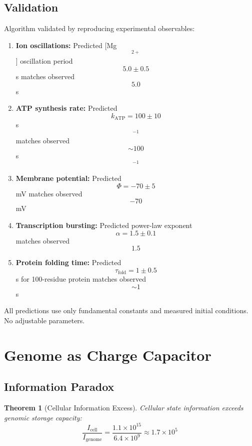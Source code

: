 \documentclass[11pt,twocolumn,a4paper]{article}
\newtheorem{theorem}{Theorem}[section]
\theoremstyle{remark}
\begin{document}
\subsection{Validation}

Algorithm validated by reproducing experimental observables:

\begin{enumerate}
\item \textbf{Ion oscillations:} Predicted [Mg$$^{2+}$$] oscillation period $$5.0 \pm 0.5$$ s matches observed $$5.0$$ s

\item \textbf{ATP synthesis rate:} Predicted $$k_{\mathrm{ATP}} = 100 \pm 10$$ s$$^{-1}$$ matches observed $$\sim 100$$ s$$^{-1}$$

\item \textbf{Membrane potential:} Predicted $$\Phi = -70 \pm 5$$ mV matches observed $$-70$$ mV

\item \textbf{Transcription bursting:} Predicted power-law exponent $$\alpha = 1.5 \pm 0.1$$ matches observed $$1.5$$

\item \textbf{Protein folding time:} Predicted $$\tau_{\mathrm{fold}} = 1 \pm 0.5$$ s for 100-residue protein matches observed $$\sim 1$$ s
\end{enumerate}

All predictions use only fundamental constants and measured initial conditions. No adjustable parameters.

\section{Genome as Charge Capacitor}
\label{sec:genome}

\subsection{Information Paradox}

\begin{theorem}[Cellular Information Excess]
\label{thm:info_excess}
Cellular state information exceeds genomic storage capacity:
$$
\frac{I_{\mathrm{cell}}}{I_{\mathrm{genome}}} = \frac{1.1 \times 10^{15}}{6.4 \times 10^9} \approx 1.7 \times 10^5
$$
\end{theorem}
\end{document}
